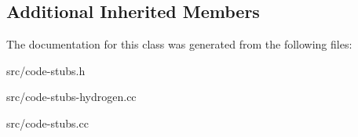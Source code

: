 \subsection*{Additional Inherited Members}


The documentation for this class was generated from the following files\+:\begin{DoxyCompactItemize}
\item 
src/code-\/stubs.\+h\item 
src/code-\/stubs-\/hydrogen.\+cc\item 
src/code-\/stubs.\+cc\end{DoxyCompactItemize}
